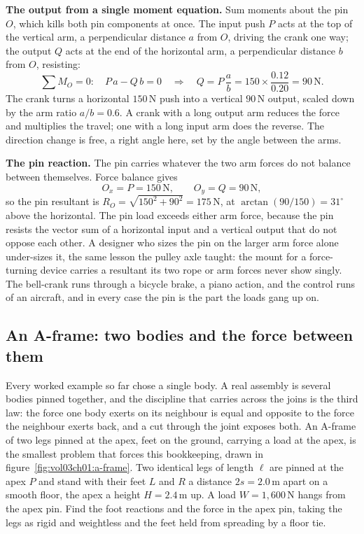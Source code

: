 \textbf{The output from a single moment equation.} Sum moments about the pin
$O$, which kills both pin components at once. The input push $P$ acts at the
top of the vertical arm, a perpendicular distance $a$ from $O$, driving the
crank one way; the output $Q$ acts at the end of the horizontal arm, a
perpendicular distance $b$ from $O$, resisting:
\[
\sum M_O = 0: \quad P\,a - Q\,b = 0
\quad\Longrightarrow\quad
Q = P\,\frac{a}{b} = 150 \times \frac{0.12}{0.20} = 90\,\text{N}.
\]
The crank turns a horizontal $150\,\text{N}$ push into a vertical $90\,\text{N}$
output, scaled down by the arm ratio $a/b = 0.6$. A crank with a long output
arm reduces the force and multiplies the travel; one with a long input arm
does the reverse. The direction change is free, a right angle here, set by the
angle between the arms.

\textbf{The pin reaction.} The pin carries whatever the two arm forces do not
balance between themselves. Force balance gives
\[
O_x = P = 150\,\text{N}, \qquad O_y = Q = 90\,\text{N},
\]
so the pin resultant is $R_O = \sqrt{150^2 + 90^2} = 175\,\text{N}$, at
$\arctan(90/150) = 31^{\circ}$ above the horizontal. The pin load exceeds
either arm force, because the pin resists the vector sum of a horizontal input
and a vertical output that do not oppose each other. A designer who sizes the
pin on the larger arm force alone under-sizes it, the same lesson the pulley
axle taught: the mount for a force-turning device carries a resultant its two
rope or arm forces never show singly. The bell-crank runs through a bicycle
brake, a piano action, and the control runs of an aircraft, and in every case
the pin is the part the loads gang up on.

\subsection{An A-frame: two bodies and the force between them}



Every worked example so far chose a single body. A real assembly is several
bodies pinned together, and the discipline that carries across the joins is the
third law: the force one body exerts on its neighbour is equal and opposite to
the force the neighbour exerts back, and a cut through the joint exposes both.
An A-frame of two legs pinned at the apex, feet on the ground, carrying a load
at the apex, is the smallest problem that forces this bookkeeping, drawn in
figure~\ref{fig:vol03ch01:a-frame}. Two identical legs of length $\ell$ are
pinned at the apex $P$ and stand with their feet $L$ and $R$ a distance $2s =
2.0\,\si{\meter}$ apart on a smooth floor, the apex a height $H = 2.4\,\si{
\meter}$ up. A load $W = 1{,}600\,\text{N}$ hangs from the apex pin. Find the
foot reactions and the force in the apex pin, taking the legs as rigid and
weightless and the feet held from spreading by a floor tie.

